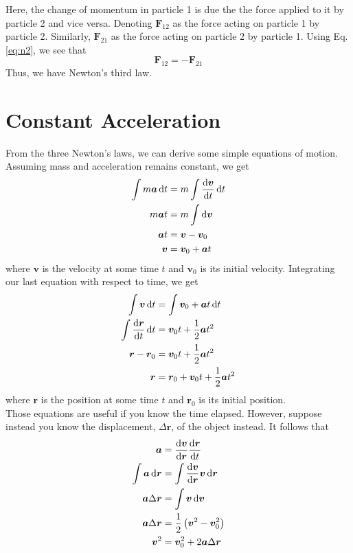 \documentclass[oneside]{book}
\numberwithin{figure}{section}
\numberwithin{equation}{section}
\newcommand{\paren}[1]{\left(#1\right)}
\theoremstyle{definition}
\begin{document}
	Here, the change of momentum in particle 1 is due the the force applied to it by particle 2 and vice versa. Denoting $ \bm{F}_{12} $ as the force acting on particle 1 by particle 2. Similarly, $ \bm{F}_{21} $ as the force acting on particle 2 by particle 1. Using Eq. \ref{eq:n2}, we see that
	\begin{equation}
		\bm{F}_{12} = -\bm{F}_{21}
	\end{equation}
	Thus, we have Newton's third law.

	\section{Constant Acceleration}
	From the three Newton's laws, we can derive some simple equations of motion. Assuming mass and acceleration remains constant, we get
	\begin{align}
		\int m\bm{a}\dd{t} &= m\int\dv{\bm{v}}{t}\dd{t}\\
		m\bm{a}t &= m\int\dd{\bm{v}}\\
		\bm{a}t &= \bm{v} - \bm{v}_0\\
		\bm{v} &= \bm{v}_0 + \bm{a}t
	\end{align}
	where $ \bm{v} $ is the velocity at some time $ t $ and $ \bm{v}_0 $ is its initial velocity. Integrating our last equation with respect to time, we get
	\begin{align}
		\int\bm{v}\dd{t} &= \int\bm{v}_0 + \bm{a}t\dd{t}\\
		\int\dv{\bm{r}}{t}\dd{t} &= \bm{v}_0t + \dfrac{1}{2}\bm{a}t^2\\
		\bm{r} - \bm{r}_0 &= \bm{v}_0t + \dfrac{1}{2}\bm{a}t^2\\
		\bm{r} &= \bm{r}_0 + \bm{v}_0t + \dfrac{1}{2}\bm{a}t^2
	\end{align}
	where $ \bm{r} $ is the position at some time $ t $ and $ \bm{r}_0 $ is its initial position.\\

	Those equations are useful if you know the time elapsed. However, suppose instead you know the displacement, $ \Delta\bm{r} $, of the object instead. It follows that
	\begin{align}
		\bm{a} &= \dv{\bm{v}}{\bm{r}}\dv{\bm{r}}{t}\\
		\int\bm{a}\dd{\bm{r}} &= \int\dv{\bm{v}}{\bm{r}}\bm{v}\dd{\bm{r}}\\
		\bm{a}\Delta\bm{r} &= \int\bm{v}\dd{\bm{v}}\\
		\bm{a}\Delta\bm{r} &= \dfrac{1}{2}\paren{\bm{v}^2 - \bm{v}_0^2}\\
		\bm{v}^2 &= \bm{v}_0^2 + 2\bm{a}\Delta\bm{r}
	\end{align}
	
\end{document}
